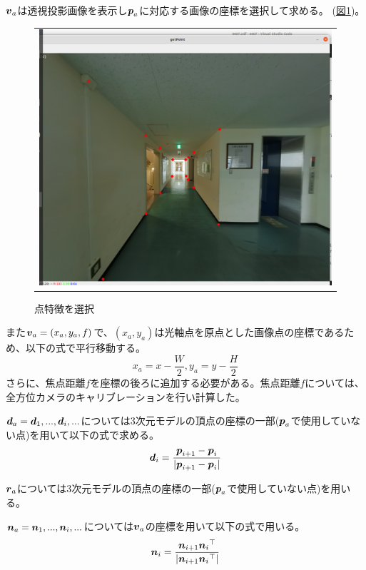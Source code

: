 \documentclass[]{jarticle}          %
\begin{document}
$\mbox{\boldmath $v$}_a$は透視投影画像を表示し$\mbox{\boldmath $p$}_a$に対応する画像の座標を選択して求める。
(\hyperref[four]{図\ref{four}})。
\begin{figure}[!ht]
  \begin{center}
    \begin{tabular}{c}
      \includegraphics[keepaspectratio, scale=0.3]{figures/select_point.png}
    \end{tabular}
  \end{center}
  \caption{点特徴を選択}
  \label{four}
\end{figure}
また$\mbox{\boldmath $v$}_a=(x_a,y_a,f)$で、$(x_a,y_a)$は光軸点を原点とした画像点の座標であるため、以下の式で平行移動する。
\begin{equation}
  x_a = x - \frac{W}{2}, y_a = y - \frac{H}{2}
\end{equation}
さらに、焦点距離$f$を座標の後ろに追加する必要がある。焦点距離$f$については、全方位カメラのキャリブレーションを行い計算した。

$\mbox{\boldmath $d$}_a={\mbox{\boldmath $d$}_1,...,\mbox{\boldmath $d$}_i,...}$については3次元モデルの頂点の座標の一部($\mbox{\boldmath $p$}_a$で使用していない点)を用いて以下の式で求める。
\begin{equation}
  \mbox{\boldmath $d$}_i = \frac{\mbox{\boldmath $p$}_{i+1}-\mbox{\boldmath $p$}_{i}}{|\mbox{\boldmath $p$}_{i+1}-\mbox{\boldmath $p$}_{i}|}
\end{equation}

$\mbox{\boldmath $r$}_a$については3次元モデルの頂点の座標の一部($\mbox{\boldmath $p$}_a$で使用していない点)を用いる。

$\mbox{\boldmath $n$}_a={\mbox{\boldmath $n$}_1,...,\mbox{\boldmath $n$}_i,...}$については$\mbox{\boldmath $v$}_a$の座標を用いて以下の式で用いる。
\begin{equation}
  \mbox{\boldmath $n$}_i = \frac{\mbox{\boldmath $n$}_{i+1}{\mbox{\boldmath $n$}_{i}}^{\top}}{|\mbox{\boldmath $n$}_{i+1}{\mbox{\boldmath $n$}_{i}}^{\top}|}
\end{equation}
\end{document}
